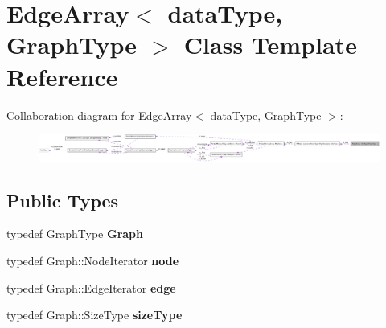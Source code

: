 \hypertarget{class_edge_array}{
\section{EdgeArray$<$ dataType, GraphType $>$ Class Template Reference}
\label{class_edge_array}
}


Collaboration diagram for EdgeArray$<$ dataType, GraphType $>$:\nopagebreak
\begin{figure}[H]
\begin{center}
\leavevmode
\includegraphics[width=400pt]{class_edge_array__coll__graph}
\end{center}
\end{figure}
\subsection*{Public Types}
\begin{DoxyCompactItemize}
\item 
\hypertarget{class_edge_array_a3571adb8b6ade0763cff7ee426114521}{
typedef GraphType {\bfseries Graph}}
\label{class_edge_array_a3571adb8b6ade0763cff7ee426114521}

\item 
\hypertarget{class_edge_array_a71a8666af3c5d75cb90e02b6de895a60}{
typedef Graph::NodeIterator {\bfseries node}}
\label{class_edge_array_a71a8666af3c5d75cb90e02b6de895a60}

\item 
\hypertarget{class_edge_array_abadc0f71daa36ebf2b3fee80064a5856}{
typedef Graph::EdgeIterator {\bfseries edge}}
\label{class_edge_array_abadc0f71daa36ebf2b3fee80064a5856}

\item 
\hypertarget{class_edge_array_a55e04ba9d239469aadb27ecf6b9aa341}{
typedef Graph::SizeType {\bfseries sizeType}}
\label{class_edge_array_a55e04ba9d239469aadb27ecf6b9aa341}

\end{DoxyCompactItemize}
